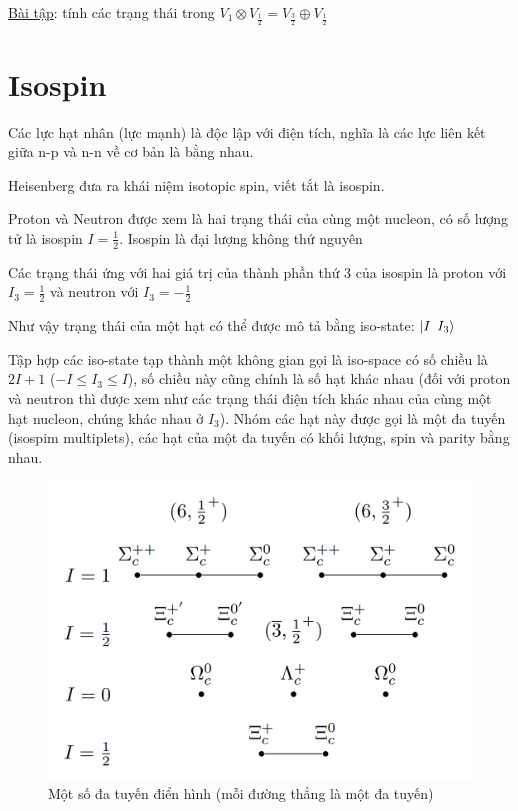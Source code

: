 \documentclass{report}
\begin{document}
\underline{Bài tập}: tính các trạng thái trong \(V_{1} \otimes V_{\frac{1}{2}} = V_{\frac{3}{2}} \oplus V_{\frac{1}{2}}\)

\section{Isospin}

Các lực hạt nhân (lực mạnh) là độc lập với điện tích, nghĩa là các lực liên kết giữa n-p và n-n về cơ bản là bằng nhau.

Heisenberg đưa ra khái niệm isotopic spin, viết tắt là isospin.

Proton và Neutron được xem là hai trạng thái của cùng một nucleon, có số lượng tử là isospin \( I = \frac{1}{2} \). Isospin là đại lượng không thứ nguyên

Các trạng thái ứng với hai giá trị của thành phần thứ 3 của isospin là proton với \( I_{3} = \frac{1}{2} \) và neutron với \( I_{3} = - \frac{1}{2} \)

Như vậy trạng thái của một hạt có thể được mô tả bằng iso-state: \( \left| I \enskip I_{3} \right\rangle\ \)

Tập hợp các iso-state tạp thành một không gian gọi là iso-space có số chiều là \(2I+1\) (\(-I \leq I_{3} \leq I\)), số chiều này cũng chính là số hạt khác nhau (đối với proton và neutron thì được xem như các trạng thái điện tích khác nhau của cùng một hạt nucleon, chúng khác nhau ở \(I_{3}\)). Nhóm các hạt này được gọi là một đa tuyến (isospim multiplets), các hạt của một đa tuyến có khối lượng, spin và parity bằng nhau.

	\begin{figure}[!htb]
		\centering
		\includegraphics[scale=0.3]{multiplets.png}
		\caption{Một số đa tuyến điển hình (mỗi đường thẳng là một đa tuyến)}
	\end{figure}
\end{document}
